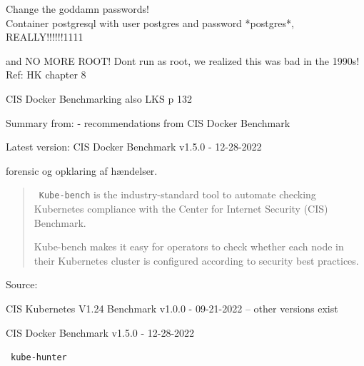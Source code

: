 \documentclass[Screen16to9,17pt]{foils}
\begin{document}

\begin{list2}
\item Change the goddamn passwords!\\
Container postgresql with user postgres and password *postgres*, REALLY!!!!!!1111

\item and NO MORE ROOT! Dont run as root, we realized this was bad in the 1990s!
Ref: HK chapter 8

\item CIS Docker Benchmarking also LKS p 132
\end{list2}

\slide{}

Summary from:  - recommendations from CIS Docker Benchmark

\begin{list2}
\item Latest version: CIS Docker Benchmark v1.5.0 - 12-28-2022
\end{list2}



\begin{list2}
\item
\end{list2}
forensic og opklaring af hændelser.



\begin{quote}
\faWrench\ \verb+Kube-bench+ is the industry-standard tool to automate checking Kubernetes compliance with the Center for Internet Security (CIS) Benchmark.

Kube-bench makes it easy for operators to check whether each node in their Kubernetes cluster is configured according to security best practices.
\end{quote}
Source: 

\begin{list2}
\item CIS Kubernetes V1.24 Benchmark v1.0.0 - 09-21-2022 -- other versions exist
\item CIS Docker Benchmark v1.5.0 - 12-28-2022
\end{list2}



\faWrench\ \verb+kube-hunter+
\end{document}
